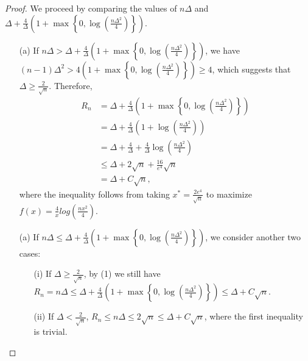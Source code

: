 \begin{proof}
    We proceed by comparing the values of $n\Delta$ and $\Delta+\frac{4}{\Delta}\left(1+\max \left\{0, \log \left(\frac{n \Delta^{2}}{4}\right)\right\}\right)$.

\begin{enumerate}
    \item[(a)] If $n\Delta > \Delta+\frac{4}{\Delta}\left(1+\max \left\{0, \log \left(\frac{n \Delta^{2}}{4}\right)\right\}\right)$,
        we have $(n - 1) \Delta^2 > 4 (1 + \max \left\{0, \log \left(\frac{n \Delta^{2}}{4}\right)\right\}) \geq 4$,
        which suggests that $\Delta \geq \frac{2}{\sqrt{n}}$.
        Therefore, \begin{equation*}
            \begin{aligned}
                R_n
                &=\Delta+\frac{4}{\Delta}\left(1+\max \left\{0, \log \left(\frac{n \Delta^{2}}{4}\right)\right\}\right)\\
                &= \Delta+\frac{4}{\Delta}\left(1+\log \left(\frac{n \Delta^{2}}{4}\right)\right)\\
                &= \Delta+\frac{4}{\Delta}+\frac{4}{\Delta}\log(\frac{n\Delta^2}{4})\\
                &\leq \Delta+2\sqrt{n}+\frac{16}{e^4}\sqrt{n}\\
                &=\Delta + C\sqrt{n},
            \end{aligned}
        \end{equation*}
        where the inequality follows from taking $x^* = \frac{2e^4}{\sqrt{n}}$ to maximize $f(x) = \frac{4}{x} log(\frac{nx^2}{4})$.

        \item[(a)] If $n\Delta \leq \Delta+\frac{4}{\Delta}\left(1+\max \left\{0, \log \left(\frac{n \Delta^{2}}{4}\right)\right\}\right)$,
        we consider another two cases:

        \begin{enumerate}
            \item[(i)] If $\Delta \geq \frac{2}{\sqrt{n}}$, by (1) we still have $R_n = n\Delta \leq \Delta+\frac{4}{\Delta}\left(1+\max \left\{0, \log \left(\frac{n \Delta^{2}}{4}\right)\right\}\right) \leq \Delta + C\sqrt{n}$.
            \item[(ii)] If $\Delta < \frac{2}{\sqrt{n}}$, $R_n \leq n\Delta \leq 2\sqrt{n} \leq \Delta + C\sqrt{n}$, where the first inequality is trivial.
        \end{enumerate}
    \end{enumerate}
\end{proof}

